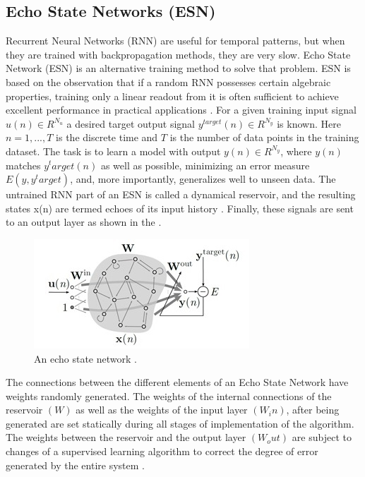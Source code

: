 \subsection{Echo State Networks (ESN)}
Recurrent Neural Networks (RNN) are useful for temporal patterns, but when they are trained with backpropagation methods, they are very slow.  Echo State Network (ESN) is an alternative training method to solve that problem.  ESN is based on the observation that if a random RNN possesses certain algebraic properties, training only a linear readout from it is often sufficient to achieve excellent performance in practical applications \citep{Lukose2009}. 
For a given training input signal $u(n)  \in R^{N_u}$ a desired target output signal $y^{target}(n) \in R^{N_y}$
is known. Here $n = 1, . . . ,T$ is the discrete time and $T$ is the number of data points in the training dataset. The task is to learn a model with output $y(n) \in R^{N_y}$, where $y(n)$ matches $y^target(n)$ as well as possible, minimizing an error measure $E(y,y^target)$, and, more importantly, generalizes well to unseen data. The untrained RNN part of an ESN is called a dynamical reservoir, and the resulting states x(n) are termed echoes of its input history \citep{Lukose2012}. Finally, these signals are sent to an output layer as shown in the .
\begin{figure}[h] 
 \centering
 \includegraphics[scale=.9]{Reservorio}
 \caption{An echo state network \citep{Lukose2012}.} 
 \label{figura3} 
\end{figure}
 
The connections between the different elements of an Echo State Network have weights randomly generated. The weights of the internal connections of the reservoir $(W)$ as well as the weights of the input layer $(W_in)$, after being generated are set statically during all stages of implementation of the algorithm. The weights between the reservoir and the output layer $(W_out)$ are subject to changes of a supervised learning algorithm to correct the degree of error generated by the entire system \citep{Lukose2012}.
